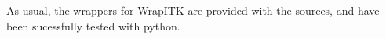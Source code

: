 \documentclass{InsightArticle}
\begin{document}
As usual, the wrappers for WrapITK are provided with the sources, and have been sucessfully
tested with python.











\appendix





\nocite{ITKSoftwareGuide}
\end{document}
